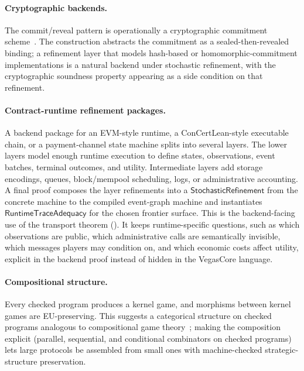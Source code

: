 \paragraph{Cryptographic backends.}
The commit/reveal pattern is operationally a cryptographic
commitment scheme~\citep{Blum1983CoinFlipping,
Naor1991BitCommitment,Pedersen1991Commitment}.  The
construction abstracts the commitment as a sealed-then-revealed
binding; a refinement layer that models hash-based or
homomorphic-commitment implementations is a natural backend
under stochastic refinement, with the cryptographic soundness
property appearing as a side condition on that refinement.

\paragraph{Contract-runtime refinement packages.}
A backend package for an EVM-style runtime, a ConCertLean-style
executable chain, or a payment-channel state machine splits into several
layers.  The lower layers model enough runtime
execution to define states, observations, event batches, terminal
outcomes, and utility.  Intermediate layers add storage encodings,
queues, block/mempool scheduling, logs, or administrative accounting.  A
final proof composes the layer refinements into a
\(\mathsf{StochasticRefinement}\) from the concrete machine to the
compiled event-graph machine and instantiates
\(\mathsf{RuntimeTraceAdequacy}\) for the chosen frontier surface.  This
is the backend-facing use of the transport theorem
().  It keeps runtime-specific questions, such
as which observations are public, which administrative calls are
semantically invisible, which messages players may condition on, and
which economic costs affect utility, explicit in the backend proof
instead of hidden in the VegasCore language.

\paragraph{Compositional structure.}
Every checked program produces a kernel game, and morphisms between
kernel games are EU-preserving.  This suggests a categorical
structure on checked programs analogous to compositional game
theory~\citep{GhaniHedgesWinschel2018CGT,Hedges2016CGT};
making the composition explicit (parallel,
sequential, and conditional combinators on checked programs)
lets large protocols be assembled from small ones with
machine-checked strategic-structure preservation.

